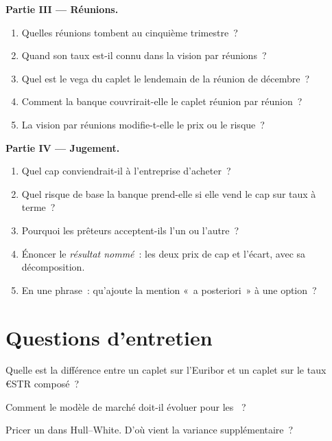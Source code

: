 \begin{problem}
\medskip\noindent\textbf{Partie III --- Réunions.}
\begin{enumerate}[resume]
\item Quelles réunions tombent au cinquième trimestre~?
\item Quand son taux est-il connu dans la vision par réunions~?
\item Quel est le vega du caplet le lendemain de la réunion de décembre~?
\item Comment la banque couvrirait-elle le caplet réunion par réunion~?
\item La vision par réunions modifie-t-elle le prix ou le risque~?
\end{enumerate}

\medskip\noindent\textbf{Partie IV --- Jugement.}
\begin{enumerate}[resume]
\item Quel cap conviendrait-il à l'entreprise d'acheter~?
\item Quel risque de base la banque prend-elle si elle vend le cap sur taux à terme~?
\item Pourquoi les prêteurs acceptent-ils l'un ou l'autre~?
\item Énoncer le \emph{résultat nommé}~: les deux prix de cap et l'écart, avec sa décomposition.
\item En une phrase~: qu'ajoute la mention «~a posteriori~» à une option~?
\end{enumerate}
\end{problem}

\section{Questions d'entretien}

\begin{interviewq}\label{iq:rc:modelling-overnight-rate-products:1}
Quelle est la différence entre un caplet sur l'Euribor et un caplet sur le taux
€STR composé~?
\end{interviewq}

\begin{interviewq}\label{iq:rc:modelling-overnight-rate-products:2}
Comment le modèle de marché doit-il évoluer pour les ~?
\end{interviewq}

\begin{interviewq}\label{iq:rc:modelling-overnight-rate-products:3}
Pricer un  dans Hull--White. D'où vient la variance
supplémentaire~?
\end{interviewq}

